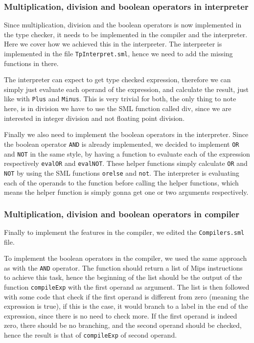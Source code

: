 \documentclass[10pt]{article}
\begin{document}
\subsubsection{Multiplication, division and boolean operators in interpreter}
Since multiplication, division and the boolean operators is now implemented in the type checker, it needs to be implemented in the compiler and the interpreter. Here we cover how we achieved this in the interpreter. The interpreter is implemented in the file \texttt{TpInterpret.sml}, hence we need to add the missing functions in there.

The interpreter can expect to get type checked expression, therefore we can simply just evaluate each operand of the expression, and calculate the result, just like with \texttt{Plus} and \texttt{Minus}. This is very trivial for both, the only thing to note here, is in division we have to use the SML function called div, since we are interested in integer division and not floating point division.

Finally we also need to implement the boolean operators in the interpreter. Since the boolean operator \texttt{AND} is already implemented, we decided to implement \texttt{OR} and \texttt{NOT} in the same style, by having a function to evaluate each of the expression respectively \texttt{evalOR} and \texttt{evalNOT}. These helper functions simply calculate \texttt{OR} and \texttt{NOT} by using the SML functions \texttt{orelse} and \texttt{not}. The interpreter is evaluating each of the operands to the function before calling the helper functions, which means the helper function is simply gonna get one or two arguments respectively.

\subsubsection{Multiplication, division and boolean operators in compiler}
Finally to implement the features in the compiler, we edited the \texttt{Compilers.sml} file.

To implement the boolean operators in the compiler, we used the same approach as with the \texttt{AND} operator. The function should return a list of Mips instructions to achieve this task, hence the beginning of the list should be the output of the function \texttt{compileExp} with the first operand as argument. The list is then followed with some code that check if the first operand is different from zero (meaning the expression is true), if this is the case, it would branch to a label in the end of the expression, since there is no need to check more. If the first operand is indeed zero, there should be no branching, and the second operand should be checked, hence the result is that of \texttt{compileExp} of second operand.
\end{document}
